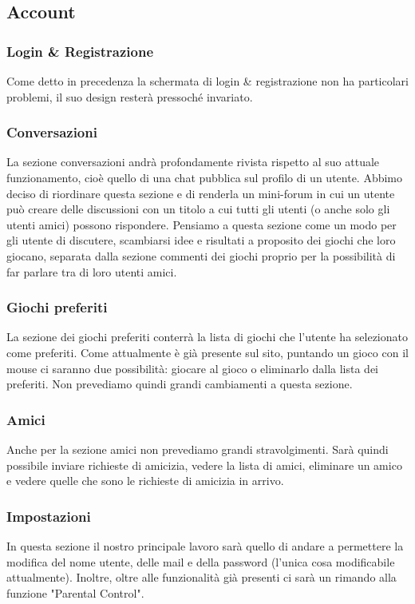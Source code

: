 \documentclass[../Report.tex]{subfiles}
\begin{document}
    \subsection{Account}
    \subsubsection{Login \& Registrazione}
    Come detto in precedenza la schermata di login \& registrazione non ha particolari problemi, il suo design resterà pressoché invariato. 
    \subsubsection{Conversazioni}
    La sezione conversazioni andrà profondamente rivista rispetto al suo attuale funzionamento, cioè quello di una chat pubblica sul profilo di un utente. Abbimo deciso di riordinare questa sezione e di renderla un mini-forum in cui un utente può creare delle discussioni con un titolo a cui tutti gli utenti (o anche solo gli utenti amici) possono rispondere. Pensiamo a questa sezione come un modo per gli utente di discutere, scambiarsi idee e risultati a proposito dei giochi che loro giocano, separata dalla sezione commenti dei giochi proprio per la possibilità di far parlare tra di loro utenti amici. 
    \subsubsection{Giochi preferiti}
    La sezione dei giochi preferiti conterrà la lista di giochi che l'utente ha selezionato come preferiti. Come attualmente è già presente sul sito, puntando un gioco con il mouse ci saranno due possibilità: giocare al gioco o eliminarlo dalla lista dei preferiti. Non prevediamo quindi grandi cambiamenti a questa sezione.
    \subsubsection{Amici}
    Anche per la sezione amici non prevediamo grandi stravolgimenti. Sarà quindi possibile inviare richieste di amicizia, vedere la lista di amici, eliminare un amico e vedere quelle che sono le richieste di amicizia in arrivo. 
    \subsubsection{Impostazioni}
    In questa sezione il nostro principale lavoro sarà quello di andare a permettere la modifica del nome utente, delle mail e della password (l'unica cosa modificabile attualmente). Inoltre, oltre alle funzionalità già presenti ci sarà un rimando alla funzione "Parental Control".
\end{document}
